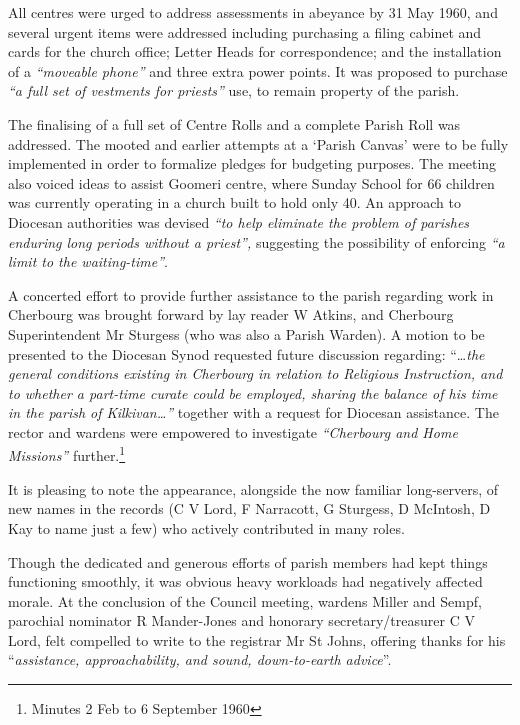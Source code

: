 All centres were urged to address assessments in abeyance by 31 May 1960, and several urgent items were addressed including purchasing a filing cabinet and cards for the church office; Letter Heads for correspondence; and the installation of a \emph{``moveable phone''} and three extra power points. It was proposed to purchase \emph{``a full set of vestments for priests''} use, to remain property of the parish.



The finalising of a full set of Centre Rolls and a complete Parish Roll was addressed. The mooted and earlier attempts at a `Parish Canvas' were to be fully implemented in order to formalize pledges for budgeting purposes. The meeting also voiced ideas to assist Goomeri centre, where Sunday School for 66 children was currently operating in a church built to hold only 40. An approach to Diocesan authorities was devised \emph{``to help eliminate the problem of parishes enduring long periods without a priest'',} suggesting the possibility of enforcing \emph{``a limit to the waiting-time''}.



A concerted effort to provide further assistance to the parish regarding work in Cherbourg was brought forward by lay reader W Atkins, and Cherbourg Superintendent Mr Sturgess (who was also a Parish Warden). A motion to be presented to the Diocesan Synod requested future discussion regarding: ``\ldots{}\emph{the general conditions existing in Cherbourg in relation to Religious Instruction, and to whether a part-time curate could be employed, sharing the balance of his time in the parish of Kilkivan\ldots''} together with a request for Diocesan assistance. The rector and wardens were empowered to investigate \emph{``Cherbourg and Home Missions''} further.\footnote{Minutes 2 Feb to 6 September 1960}


It is pleasing to note the appearance, alongside the now familiar long-servers, of new names in the records (C V Lord, F Narracott, G Sturgess, D McIntosh, D Kay to name just a few) who actively contributed in many roles.



Though the dedicated and generous efforts of parish members had kept things functioning smoothly, it was obvious heavy workloads had negatively affected morale. At the conclusion of the Council meeting, wardens Miller and Sempf, parochial nominator R Mander-Jones and honorary secretary/treasurer C V Lord, felt compelled to write to the registrar Mr St Johns, offering thanks for his ``\emph{assistance, approachability, and sound, down-to-earth advice}''.



